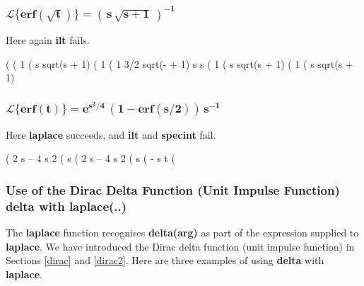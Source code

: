\documentclass[12pt]{article}
\begin{document}
\subsubsection*{$\mathbf{\mathcal{L} \{erf(\sqrt{t})\} = (\,s\,\sqrt{s+1}\,)^{-1}}$}
Here again \textbf{ilt} fails. 
\begin{myVerbatim}
(%
(%
                                       1
(%
                                 s sqrt(s + 1)
(%
                                      1
(%
                                    1       3/2
                               sqrt(- + 1) s
                                    s
(%
                                       1
(%
                                 s sqrt(s + 1)
(%
                                     1
(%
                               s sqrt(s + 1)								 
\end{myVerbatim}
\subsubsection*{$\mathbf{\mathcal{L} \{erf(t)\} = e^{s^{2}/4}\,(1 - erf(s/2))\,s^{-1}}$}
Here \textbf{laplace} succeeds, and \textbf{ilt} and \textbf{specint} fail.
\begin{myVerbatim}
(%
                                  2
                                 s
                                 --
                                 4           s
                                             2
(%
                                       s
(%
                                2
                               s
                               --
                               4           s
                                           2
(%
                                     s
(%
                                    - s t
(%
\end{myVerbatim}
\newpage
\subsubsection{Use of the Dirac Delta Function (Unit Impulse Function) \textbf{delta} with \textbf{laplace(..)} }
The \textbf{laplace} function recognises \textbf{delta(arg)} as part of the expression
supplied to \textbf{laplace}.
We have introduced the Dirac delta function (unit impulse function) 
  in Sections \ref{dirac} and \ref{dirac2}.  
Here are three examples of using \textbf{delta}  with \textbf{laplace}.
\end{document}
